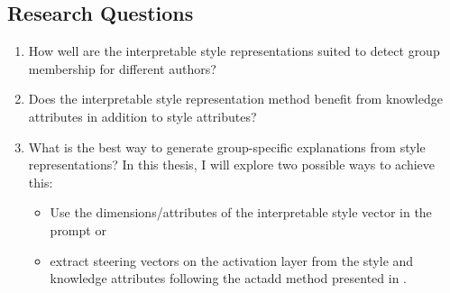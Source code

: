 \subsection{Research Questions}
\begin{enumerate}
	\item How well are the interpretable style representations suited to detect group membership for different authors?
	\item Does the interpretable style representation method benefit from knowledge attributes in addition to style attributes?
	\item What is the best way to generate group-specific explanations from style representations? \newline
	      In this thesis, I will explore two possible ways to achieve this:
	      \begin{itemize}
		      \item Use the dimensions/attributes of the interpretable style vector in the prompt or
		      \item extract steering vectors on the activation layer from the style and knowledge attributes following the \ac{actadd} method presented in \citet{turnerActivationAdditionSteering2024}.
	      \end{itemize}
\end{enumerate}

